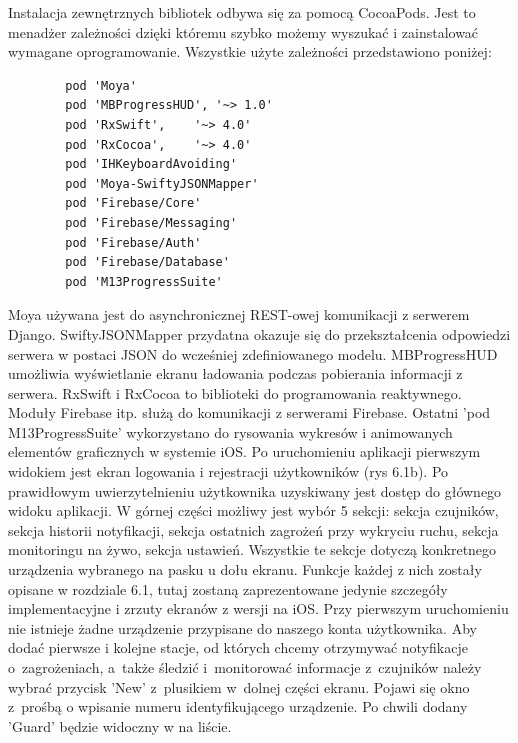 \documentclass[polish,bachelor,a4paper,oneside]{ppfcmthesis}
\begin{document}
    Instalacja zewnętrznych bibliotek odbywa się za pomocą CocoaPods. Jest to menadżer zależności dzięki któremu szybko możemy wyszukać i zainstalować wymagane oprogramowanie. Wszystkie użyte zależności przedstawiono poniżej:
    \begin{verbatim}
        pod 'Moya'
        pod 'MBProgressHUD', '~> 1.0'
        pod 'RxSwift',    '~> 4.0'
        pod 'RxCocoa',    '~> 4.0'
        pod 'IHKeyboardAvoiding'
        pod 'Moya-SwiftyJSONMapper'
        pod 'Firebase/Core'
        pod 'Firebase/Messaging'
        pod 'Firebase/Auth'
        pod 'Firebase/Database'
        pod 'M13ProgressSuite'
    \end{verbatim}
    Moya używana jest do asynchronicznej REST-owej komunikacji z serwerem Django. SwiftyJSONMapper przydatna okazuje się do przekształcenia odpowiedzi serwera w postaci JSON do wcześniej zdefiniowanego modelu. MBProgressHUD umożliwia wyświetlanie ekranu ładowania podczas pobierania informacji z serwera. RxSwift i RxCocoa to biblioteki do programowania reaktywnego. Moduły Firebase itp. służą do komunikacji z serwerami Firebase. Ostatni 'pod M13ProgressSuite' wykorzystano do rysowania wykresów i animowanych elementów graficznych w systemie iOS.
    Po uruchomieniu aplikacji pierwszym widokiem jest ekran logowania i rejestracji użytkowników (rys 6.1b).
    Po prawidłowym uwierzytelnieniu użytkownika uzyskiwany jest dostęp do głównego widoku aplikacji. W górnej części możliwy jest wybór 5 sekcji:
    sekcja czujników, sekcja historii notyfikacji, sekcja ostatnich zagrożeń przy wykryciu ruchu, sekcja monitoringu na żywo, sekcja ustawień. Wszystkie te sekcje dotyczą konkretnego urządzenia wybranego na pasku u dołu ekranu. Funkcje każdej z nich zostały opisane w rozdziale 6.1, tutaj zostaną zaprezentowane jedynie szczegóły implementacyjne i zrzuty ekranów z wersji na iOS. Przy pierwszym uruchomieniu nie istnieje żadne urządzenie przypisane do naszego konta użytkownika. Aby dodać pierwsze i kolejne stacje, od których chcemy otrzymywać notyfikacje o~zagrożeniach, a~także śledzić i~monitorować informacje z~czujników należy wybrać przycisk 'New' z~plusikiem w~dolnej części ekranu. Pojawi się okno z~prośbą o wpisanie numeru identyfikującego urządzenie. Po chwili dodany 'Guard' będzie widoczny w na liście.
\end{document}
